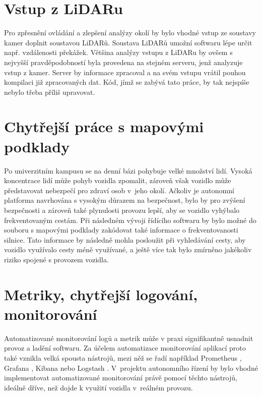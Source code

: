 \documentclass[czech, bachelor]{diploma}
\begin{document}
\section{Vstup z LiDARu}

Pro zpřesnění ovládání a zlepšení analýzy okolí by bylo vhodné vstup ze soustavy kamer doplnit soustavou LiDARů. Soustava LiDARů
umožní softwaru lépe určit např. vzdálenosti překážek. Většina analýzy vstupu z LiDARu by ovšem s nejvyšší pravděpodobností byla
provedena na stejném serveru, jenž analyzuje vstup z kamer. Server by informace zpracoval a na svém vstupu vrátil pouhou kompilaci
již zpracovaných dat. Kód, jímž se zabývá tato práce, by tak nejspíše nebylo třeba příliš upravovat.

\section{Chytřejší práce s mapovými podklady} \label{smarter-maps}

Po univerzitním kampusu se na denní bázi pohybuje velké množství lidí. Vysoká koncentrace lidí může pohyb vozidla zpomalit,
zároveň však vozidlo může představovat nebezpečí pro zdraví osob v~jeho okolí. Ačkoliv je autonomní platforma navrhována s vysokým
důrazem na bezpečnost, bylo by pro zvýšení bezpečnosti a zároveň také plynulosti provozu lepší, aby se vozidlo vyhýbalo
frekventovaným cestám. Při následném vývoji řídícího softwaru by bylo možné do souboru s mapovými podklady zakódovat také
informace o frekventovanosti silnice. Tato informace by následně mohla posloužit při vyhledávání cesty, aby vozidlo využívalo
cesty méně využívané, a ještě více tak bylo zmírněno jakékoliv riziko spojené s provozem vozidla.

\section{Metriky, chytřejší logování, monitorování}

Automatizované monitorování logů \cite{elk-source} a metrik \cite{prometheus-source} může v praxi signifikantně usnadnit provoz a
ladění softwaru. Za účelem automatizace monitorování aplikací proto také vznikla velká spousta nástrojů, mezi něž se řadí
například Prometheus \cite{prometheus-source}, Grafana \cite{prometheus-source}, Kibana nebo Logstash \cite{elk-source}.
V~projektu autonomního řízení by bylo vhodné implementovat automatizované monitorování právě pomocí těchto nástrojů, ideálně
dříve, než dojde k využití vozidla v~reálném provozu.
\end{document}
